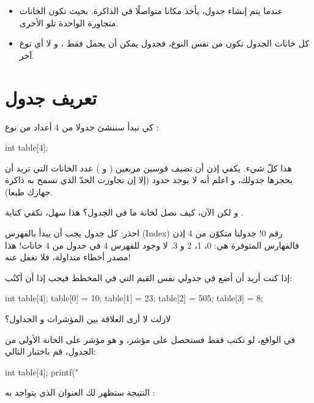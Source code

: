 \begin{itemize}
  \item عندما يتم إنشاء جدول، يأخذ مكانا متواصلًا في الذاكرة. بحيث تكون الخانات متجاورة الواحدة تلو الأخرى.
  \item كل خانات الجدول تكون من نفس النوع، فجدول
يمكن أن يحمل فقط
،
و لا أي نوع آخر.
\end{itemize}

\section{تعريف جدول}

كي نبدأ سننشئ جدولا من 4 أعداد من نوع
:

\begin{Csource}
int table[4];
\end{Csource}

هذا كلّ شيء. يكفي إذن أن تضيف قوسين مربعين
(\InlineCode{[}
و
\InlineCode{]})
عدد الخانات التي تريد أن يحجزها جدولك، و اعلم أنه لا يوجد حدود (إلا إن تجاوزت الحدّ الذي تسمح به ذاكرة جهازك طبعا).

و لكن الآن، كيف نصل لخانة ما في الجدول؟
هذا سهل، تكفي كتابة
.

\begin{critical}
 احذر: كل جدول يجب أن يبدأ بالفهرس
(\textenglish{Index})
رقم 0! جدولنا متكوّن من 4
إذن فالفهارس المتوفرة هي: 0، 1، 2 و 3. لا وجود للفهرس 4 في جدول من 4 خانات! هذا مصدر أخطاء متداولة، فلا تغفل عنه!

\end{critical}

إذا كنت أريد أن أضع في جدولي نفس القيم التي في المخطط فيجب إذا أن أكتُب:

\begin{Csource}
int table[4];
table[0] = 10;
table[1] = 23;
table[2] = 505;
table[3] = 8;
\end{Csource}

\begin{question}
  لازلت لا أرى العلاقة بين المؤشرات و الجداول؟
\end{question}

في الواقع، لو تكتب فقط
فستحصل على مؤشر، و هو مؤشر على الخانة الأولى من الجدول، قم باختبار التالي:

\begin{Csource}
int table[4];
printf("%
\end{Csource}

النتيجة ستظهر لك العنوان الذي يتواجد به
:

